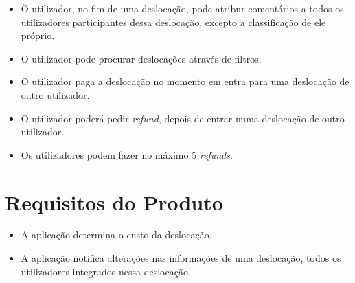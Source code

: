 \begin{itemize}
    \item O utilizador, no fim de uma deslocação, pode atribur comentários a todos os utilizadores participantes dessa deslocação, excepto a classificação  de ele próprio.
    \item O utilizador pode procurar deslocações através de filtros.
    \item O utilizador paga a deslocação no momento em entra para uma deslocação de outro utilizador.
    \item O utilizador poderá pedir \emph{refund}, depois de entrar numa deslocação de outro utilizador.
    \item Os utilizadores podem fazer no máximo 5 \emph{refunds}.
\end{itemize}

\section{Requisitos do Produto}
\begin{itemize}
    \item A aplicação determina o custo da deslocação.
    \item A aplicação notifica alterações nas informações de uma deslocação, todos os utilizadores integrados nessa deslocação.
    
\end{itemize}{}